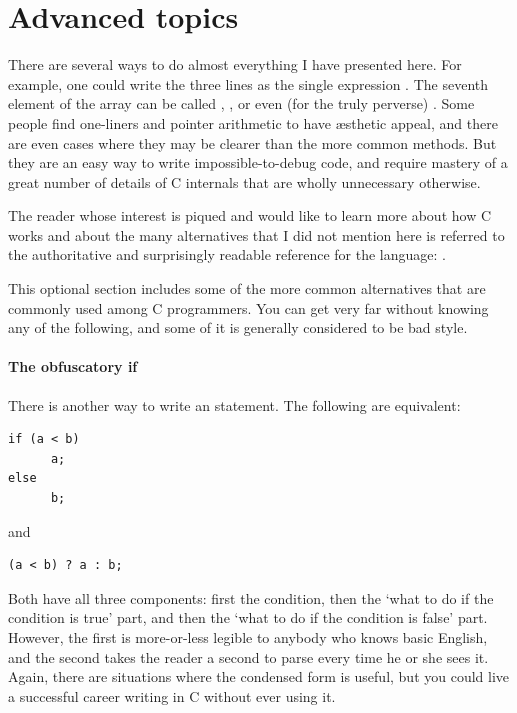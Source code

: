 
\section{\treesymbol Advanced topics}   
There are several ways to do almost everything I have presented here.  For
example, one could write the three lines  as the single expression . The seventh
element of the array  can be called ,
, or even (for the truly perverse) .  Some people find one-liners and pointer arithmetic
to have \ae{}sthetic appeal, and there are even cases where they may
be clearer than the more common methods. But they are an easy way to
write impossible-to-debug code, and require mastery of a great number
of details of C internals that are wholly unnecessary otherwise.

The reader whose interest is piqued and would like to learn more about
how C works and about the many alternatives that I did not mention here
is referred to the authoritative and surprisingly readable reference
for the language: \cite{kandr:c}.

This optional section includes some of the more common alternatives that
are commonly used among C programmers. You can get very far without
knowing any of the following, and some of it is generally considered to
be bad style.

\paragraph{The obfuscatory if} There is another way to write an  statement. The following are equivalent:
\begin{lstlisting}
if (a < b)
      a;
else
      b;
\end{lstlisting}
and
\begin{lstlisting}
(a < b) ? a : b;
\end{lstlisting}
Both have all three components: first the condition, then the `what to do if the
condition is true' part, and then the `what to do if the condition is false'
part. However, the first is more-or-less legible to anybody who knows basic English,
and the second takes the reader a second to parse every time he or she
sees it. Again, there are situations where the condensed form is useful,
but you could live a successful career writing in C without ever using it.


